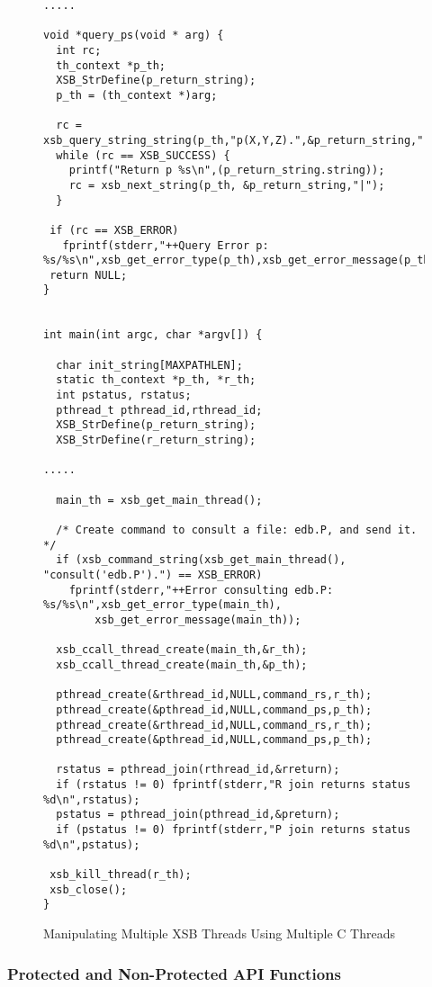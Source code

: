 \begin{figure}[hbtp]
\begin{small}
\begin{verbatim}
.....

void *query_ps(void * arg) {
  int rc;
  th_context *p_th;
  XSB_StrDefine(p_return_string);
  p_th = (th_context *)arg;
  
  rc = xsb_query_string_string(p_th,"p(X,Y,Z).",&p_return_string,"|");
  while (rc == XSB_SUCCESS) {
    printf("Return p %s\n",(p_return_string.string));
    rc = xsb_next_string(p_th, &p_return_string,"|");
  }

 if (rc == XSB_ERROR) 
   fprintf(stderr,"++Query Error p: %s/%s\n",xsb_get_error_type(p_th),xsb_get_error_message(p_th));
 return NULL;
}


int main(int argc, char *argv[]) { 

  char init_string[MAXPATHLEN];
  static th_context *p_th, *r_th;
  int pstatus, rstatus;
  pthread_t pthread_id,rthread_id;
  XSB_StrDefine(p_return_string);
  XSB_StrDefine(r_return_string);

.....

  main_th = xsb_get_main_thread();

  /* Create command to consult a file: edb.P, and send it. */
  if (xsb_command_string(xsb_get_main_thread(), "consult('edb.P').") == XSB_ERROR)
    fprintf(stderr,"++Error consulting edb.P: %s/%s\n",xsb_get_error_type(main_th),
	    xsb_get_error_message(main_th));

  xsb_ccall_thread_create(main_th,&r_th);
  xsb_ccall_thread_create(main_th,&p_th);

  pthread_create(&rthread_id,NULL,command_rs,r_th);
  pthread_create(&pthread_id,NULL,command_ps,p_th);
  pthread_create(&rthread_id,NULL,command_rs,r_th);
  pthread_create(&pthread_id,NULL,command_ps,p_th);

  rstatus = pthread_join(rthread_id,&rreturn);
  if (rstatus != 0) fprintf(stderr,"R join returns status %d\n",rstatus);
  pstatus = pthread_join(pthread_id,&preturn);
  if (pstatus != 0) fprintf(stderr,"P join returns status %d\n",pstatus);

 xsb_kill_thread(r_th);
 xsb_close();      
}
\end{verbatim}
\end{small}
\caption{Manipulating Multiple XSB Threads Using Multiple C Threads} 
\label{fig:varstringex3}
\end{figure}

\subsubsection{Protected and Non-Protected API Functions} 

